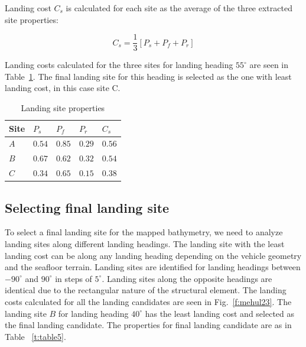  Landing cost $C_s$ is calculated for each site as the average of the three extracted site properties:
 
 \begin{equation}
 \label{eq:eq13}
	C_s = \frac{1}{3}\left[P_s + P_f + P_r \right]
\end{equation} 

Landing costs calculated for the three sites for landing heading $55^\circ$ are seen in Table~\ref{t:table4}. The final landing site for this heading is selected as the one with least landing cost, in this case site C.
   			
\begin{table}[!ht]
\centering
\caption{Landing site properties}
\begin{tabular}{  |p{2cm} p{2cm} p{2cm} p{2cm} p{2cm}| }
\hline
\textbf{Site} & \textbf{$P_s$} & \textbf{$P_f$} & \textbf{$P_r$} & \textbf{$C_s$}\\ \hline 
$A$ & $0.54$ & $0.85$ & $0.29$ & $0.56$ \\
$B$ & $0.67$ & $0.62$ & $0.32$ & $0.54$ \\
$C$ & $0.34$ & $0.65$ & $0.15$ & $0.38$ \\
\hline
\end{tabular}
\label{t:table4}
\end{table}

\subsection{Selecting final landing site}

To select a final landing site for the mapped bathymetry, we need to analyze landing sites along different landing headings. The landing site with the least landing cost can be along any landing heading depending on the vehicle geometry and the seafloor terrain. Landing sites are identified for landing headings between $-90^\circ$ and $90^\circ$ in steps of $5^\circ$. Landing sites along the opposite headings are identical due to the rectangular nature of the structural element. The landing costs calculated for all the landing candidates are seen in Fig.~\ref{f:mehul23}. The landing site $B$ for landing heading $40^\circ$ has the least landing cost and selected as the final landing candidate. The properties for final landing candidate are as in Table ~\ref{t:table5}.


